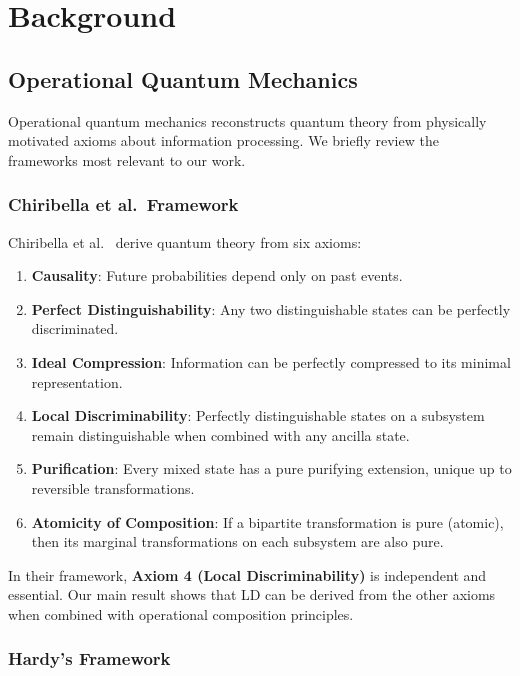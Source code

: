 \documentclass[11pt,a4paper]{article}
\theoremstyle{definition}
\theoremstyle{remark}
\begin{document}
\section{Background}
\label{sec:background}

\subsection{Operational Quantum Mechanics}

Operational quantum mechanics reconstructs quantum theory from physically motivated axioms about information processing. We briefly review the frameworks most relevant to our work.

\subsubsection{Chiribella et al.\ Framework}

Chiribella et al.\ \cite{chiribella2011informational} derive quantum theory from six axioms:

\begin{enumerate}
\item \textbf{Causality}: Future probabilities depend only on past events.
\item \textbf{Perfect Distinguishability}: Any two distinguishable states can be perfectly discriminated.
\item \textbf{Ideal Compression}: Information can be perfectly compressed to its minimal representation.
\item \textbf{Local Discriminability}: Perfectly distinguishable states on a subsystem remain distinguishable when combined with any ancilla state.
\item \textbf{Purification}: Every mixed state has a pure purifying extension, unique up to reversible transformations.
\item \textbf{Atomicity of Composition}: If a bipartite transformation is pure (atomic), then its marginal transformations on each subsystem are also pure.
\end{enumerate}

In their framework, \textbf{Axiom 4 (Local Discriminability)} is independent and essential. Our main result shows that LD can be derived from the other axioms when combined with operational composition principles.

\subsubsection{Hardy's Framework}
\end{document}
